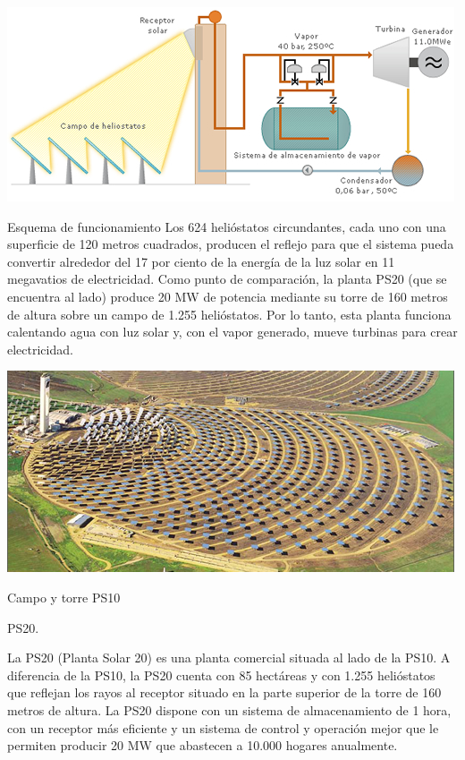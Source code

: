 \documentclass[12pt]{article}
\begin{document}
\includegraphics[width=\textwidth]{unnamed (7).jpg}

Esquema de funcionamiento
Los 624 helióstatos circundantes, cada uno con una superficie de 120 metros cuadrados, producen el reflejo para que el sistema pueda convertir alrededor del 17 por ciento de la energía de la luz solar en 11 megavatios de electricidad. Como punto de comparación, la planta PS20 (que se encuentra al lado) produce 20 MW de potencia mediante su torre de 160 metros de altura sobre un campo de 1.255 helióstatos.
Por lo tanto, esta planta funciona calentando agua con luz solar y, con el vapor generado, mueve turbinas para crear electricidad.

\includegraphics[width=\textwidth]{unnamed (6).jpg}

Campo y torre PS10
\cite{JonathanWebSite}



PS20.

La PS20 (Planta Solar 20) es una planta comercial situada al lado de la PS10.
A diferencia de la PS10, la PS20 cuenta con 85 hectáreas y con 1.255 helióstatos que reflejan los rayos al receptor situado en la parte superior de la torre de 160 metros de altura.
La PS20 dispone con un sistema de almacenamiento de 1 hora, con un receptor más eficiente y un sistema de control y operación mejor que le permiten producir 20 MW que abastecen a 10.000 hogares anualmente.
\end{document}
